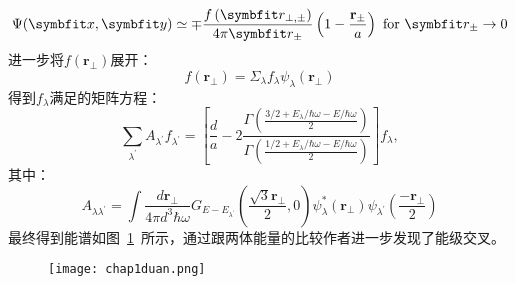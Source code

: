 \begin{equation}
\Psi(\Vector{x}, \Vector{y}) \simeq \mp \frac{f\left(\Vector{r}_{\perp, \pm}\right)}{4 \pi \Vector{r}_{\pm}}\left(1-\frac{\mathbf{r}_{\pm}}{a}\right) \text { for } \Vector{r}_{\pm} \rightarrow 0
\end{equation}
进一步将$f\left(\mathbf{r}_{\perp}\right)$展开：
\begin{equation}
f\left(\mathbf{r}_{\perp}\right)=\Sigma_{\lambda} f_{\lambda} \psi_{\lambda}\left(\mathbf{r}_{\perp}\right)
\end{equation}
得到$f_\lambda$满足的矩阵方程：
\begin{equation}
\sum_{\lambda^{\prime}} A_{\lambda^{\prime}} f_{\lambda^{\prime}}=\left[\frac{d}{a}-2 \frac{\Gamma\left(\frac{3 / 2+E_{\lambda} / \hbar \omega-E / \hbar \omega}{2}\right)}{\Gamma\left(\frac{1 / 2+E_{\lambda} / \hbar \omega-E / \hbar \omega}{2}\right)}\right] f_{\lambda},
\end{equation}
其中：
\begin{equation}
A_{\lambda \lambda^{\prime}}=\int \frac{d \mathbf{r}_{\perp}}{4 \pi d^{3} \hbar \omega} G_{E-E_{\lambda^{\prime}}}\left(\frac{\sqrt{3} \mathbf{r}_{\perp}}{2}, 0\right) \psi_{\lambda}^{*}\left(\mathbf{r}_{\perp}\right) \psi_{\lambda^{\prime}}\left(\frac{-\mathbf{r}_{\perp}}{2}\right)
\end{equation}
最终得到能谱如图~\ref{duancrossing}~所示，通过跟两体能量的比较作者进一步发现了能级交叉。
\begin{figure}[!htbp]
    \centering
    \texttt{[image: chap1duan.png]}
    \label{duancrossing}
\end{figure}

